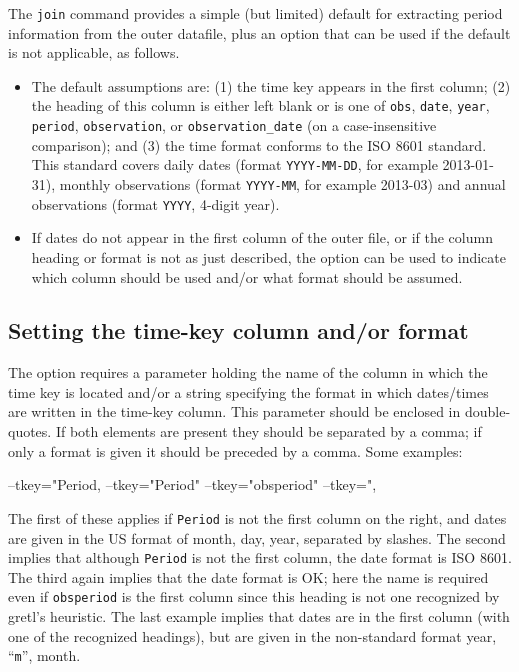 The \texttt{join} command provides a simple (but limited) default for
extracting period information from the outer datafile, plus an
option that can be used if the default is not applicable, as follows.
\begin{itemize}
\item The default assumptions are: (1) the time key appears in the
  first column; (2) the heading of this column is either left blank or
  is one of \texttt{obs}, \texttt{date}, \texttt{year},
  \texttt{period}, \texttt{observation}, or \verb|observation_date|
  (on a case-insensitive comparison); and (3) the time format conforms
  to the ISO 8601 standard. This standard covers daily dates (format
  \texttt{YYYY-MM-DD}, for example 2013-01-31), monthly observations
  (format \texttt{YYYY-MM}, for example 2013-03) and annual
  observations (format \texttt{YYYY}, 4-digit year).
\item If dates do not appear in the first column of the outer file, or
  if the column heading or format is not as just described, the
   option can be used to indicate which column should be
  used and/or what format should be assumed.
\end{itemize}

\subsection{Setting the time-key column and/or format}

The  option requires a parameter holding the name of the
column in which the time key is located and/or a string specifying the
format in which dates/times are written in the time-key column. This
parameter should be enclosed in double-quotes. If both elements are
present they should be separated by a comma; if only a format is given
it should be preceded by a comma. Some examples:

\begin{code}
--tkey="Period,%
--tkey="Period"
--tkey="obsperiod"
--tkey=",%
\end{code}

The first of these applies if \texttt{Period} is not the first column
on the right, and dates are given in the US format of month, day,
year, separated by slashes. The second implies that although
\texttt{Period} is not the first column, the date format is ISO 8601.
The third again implies that the date format is OK; here the name is
required even if \texttt{obsperiod} is the first column since this
heading is not one recognized by gretl's heuristic. The last example
implies that dates are in the first column (with one of the recognized
headings), but are given in the non-standard format year,
``\texttt{m}'', month.

